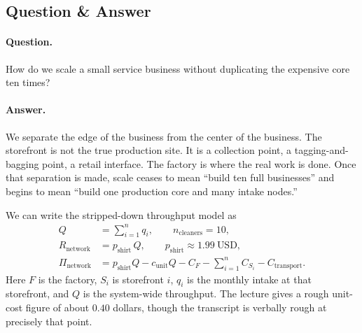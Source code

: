 \subsection{Question \& Answer}

\paragraph{Question.} How do we scale a small service business without duplicating the expensive core ten times?

\paragraph{Answer.} We separate the edge of the business from the center of the business. The storefront is not the true production site. It is a collection point, a tagging-and-bagging point, a retail interface. The factory is where the real work is done. Once that separation is made, scale ceases to mean ``build ten full businesses'' and begins to mean ``build one production core and many intake nodes.''

\begin{figure}[h]
\centering
{}
\end{figure}

We can write the stripped-down throughput model as
\begin{align}
Q &= \sum_{i=1}^{n} q_i, \qquad n_{\text{cleaners}} = 10, \\
R_{\text{network}} &= p_{\text{shirt}}\,Q, \qquad p_{\text{shirt}} \approx 1.99\ \text{USD}, \\
\Pi_{\text{network}} &= p_{\text{shirt}}Q - c_{\text{unit}}Q - C_F - \sum_{i=1}^{n} C_{S_i} - C_{\text{transport}}.
\end{align}
Here $F$ is the factory, $S_i$ is storefront $i$, $q_i$ is the monthly intake at that storefront, and $Q$ is the system-wide throughput. The lecture gives a rough unit-cost figure of about $0.40$ dollars, though the transcript is verbally rough at precisely that point.

